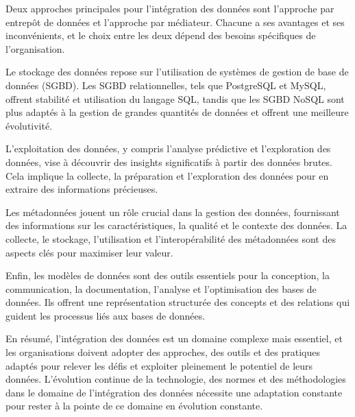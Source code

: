 \documentclass{article}
\begin{document}
	Deux approches principales pour l’intégration des données sont l’approche par entrepôt de données et l’approche par médiateur. Chacune a ses avantages et ses inconvénients, et le choix entre les deux dépend des besoins spécifiques de l’organisation.
	
	Le stockage des données repose sur l’utilisation de systèmes de gestion de base de données (SGBD). Les SGBD relationnelles, tels que PostgreSQL et MySQL, offrent stabilité et utilisation du langage SQL, tandis que les SGBD NoSQL sont plus adaptés à la gestion de grandes quantités de données et offrent une meilleure évolutivité.
	
	L’exploitation des données, y compris l’analyse prédictive et l’exploration des données, vise à découvrir des insights significatifs à partir des données brutes. Cela implique la collecte, la préparation et l’exploration des données pour en extraire des informations précieuses.
	
	Les métadonnées jouent un rôle crucial dans la gestion des données, fournissant des informations sur les caractéristiques, la qualité et le contexte des données. La collecte, le stockage, l’utilisation et l’interopérabilité des métadonnées sont des aspects clés pour maximiser leur valeur.
	
	Enfin, les modèles de données sont des outils essentiels pour la conception, la communication, la documentation, l’analyse et l’optimisation des bases de données. Ils offrent une représentation structurée des concepts et des relations qui guident les processus liés aux bases de données.
	
	En résumé, l’intégration des données est un domaine complexe mais essentiel, et les organisations doivent adopter des approches, des outils et des pratiques adaptés pour relever les défis et exploiter pleinement le potentiel de leurs données. L'évolution continue de la technologie, des normes et des méthodologies dans le domaine de l'intégration des données nécessite une adaptation constante pour rester à la pointe de ce domaine en évolution constante.
	
\end{document}
